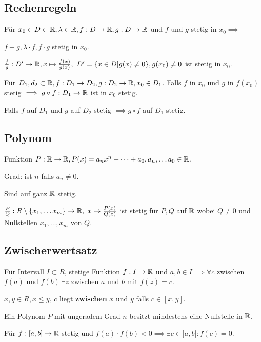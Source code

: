 \subsection{Rechenregeln}
Für $x_0 \in D \subset \mathbb{R}, \lambda \in \mathbb{R}, f: D \to \mathbb{R}, g: D \to \mathbb{R}$ und $f$ und $g$ stetig in $x_0 \implies$
\begin{compactenum}
    \item $f + g, \lambda \cdot f, f \cdot g$ stetig in $x_0$.
    \item $\frac{f}{g}: D' \to \mathbb{R}, x \mapsto \frac{f(x)}{g(x)}, \ D' = \{x \in D | g(x) \neq 0\}, g(x_0) \neq 0$ ist stetig in $x_0$.
\end{compactenum}
Für $D_1, d_2 \subset \mathbb{R}, f: D_1 \to D_2, g: D_2 \to \mathbb{R}, x_0 \in D_1$. Falls $f$ in $x_0$ und $g$ in $f(x_0)$ stetig $\implies g \circ f : D_1 \to \mathbb{R}$ ist in $x_0$ stetig.
\begin{compactitem}
    \item Falls $f$ auf $D_1$ und $g$ auf $D_2$ stetig $\implies g \circ f$ auf $D_1$ stetig.
\end{compactitem}

\subsection{Polynom}
Funktion $P: \mathbb{R} \to \mathbb{R}, P(x)= a_nx^n + \dots + a_0, a_n, \dots a_0 \in \mathbb{R}$.
\begin{compactdesc}
    \item[Grad:] ist $n$ falls $a_n \neq 0$.
\end{compactdesc}
\begin{compactitem}
    \item Sind auf ganz $\mathbb{R}$ stetig.
    \item $\frac{P}{Q}: R \setminus \{x_1, \dots x_m\}  \to \mathbb{R}, \ x \mapsto \frac{P(x)}{Q(x)}$ ist stetig für $P,Q$ auf $\mathbb{R}$ wobei $ Q \neq 0$  und Nullstellen $x_1, \dots, x_m$ von $Q$.
\end{compactitem}

\subsection{Zwischerwertsatz}
Für Intervall $I \subset R$, stetige Funktion $f: I \to \mathbb{R}$ und $a, b \in I \implies \forall c$ zwischen $f(a)$ und $f(b) \ \exists z$ zwischen $a$ und $b$ mit $f(z) = c$.
\begin{compactitem}
    \item $x, y \in R, x \le y$, $c$ liegt \textbf{zwischen} $x$ und $y$ falls $c \in [x, y]$.
    \item Ein Polynom $P$ mit ungeradem Grad $n$ besitzt mindestens eine Nullstelle in $\mathbb{R}$.
    \item Für $f: [a,b] \to \mathbb{R}$ stetig und $f(a) \cdot f(b) < 0 \implies \exists c \in ]a,b[: f(c) = 0$.
\end{compactitem}

